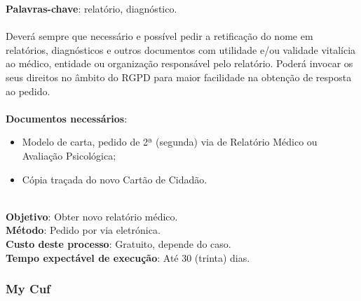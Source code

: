 \textbf{Palavras-chave}: relatório, diagnóstico. \\
\\
Deverá sempre que necessário e possível pedir a retificação do nome em
relatórios, diagnósticos e outros documentos com utilidade e/ou validade
vitalícia ao médico, entidade ou organização responsável pelo relatório.
Poderá invocar os seus direitos no âmbito do RGPD para maior facilidade
na obtenção de resposta ao pedido. \\
\\
\textbf{Documentos necessários}:
\begin{itemize}
	\item
	Modelo de carta, pedido de 2ª (segunda) via de Relatório Médico ou
	Avaliação Psicológica;
	\item
	Cópia traçada do novo Cartão de Cidadão.
\end{itemize}
\leavevmode\\
\textbf{Objetivo}: Obter novo relatório médico. \\ 
\textbf{Método}: Pedido por via eletrónica. \\
\textbf{Custo deste processo}: Gratuito, depende do caso. \\ 
\textbf{Tempo expectável de execução}: Até 30 (trinta) dias.

\newpage

\subsubsection{My Cuf}

